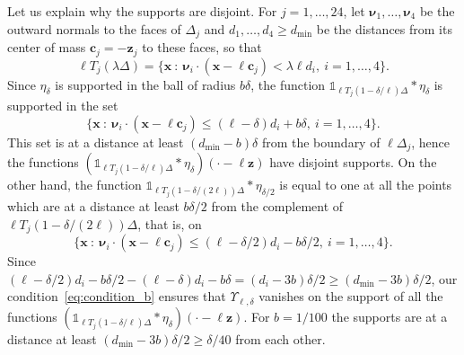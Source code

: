 \documentclass[final,reqno]{amsart}
\theoremstyle{remark}
\renewcommand{\le}{\leqslant}
\renewcommand{\ge}{\geqslant}
\newcommand{\iden}{\mathbb{1}}
\newcommand{\tetra}{\mathbb{\Delta}}
\begin{document}
Let us explain why the supports are disjoint. For $j=1,\ldots,24$, let $\bm{\nu}_1,\ldots,\bm{\nu}_4$ be the outward normals to the faces of $\tetra_j$ and $d_1,\ldots,d_4\ge d_{\min}$ be the distances from its center of mass $\mathbf{c}_j=-\mathbf{z}_j$ to these faces, so that
$$
\ell T_j(\lambda\tetra)=\big\{\mathbf{x}\ :\ \bm{\nu}_i\cdot(\mathbf{x}-\ell \mathbf{c}_j)<\lambda\ell d_i,\ i=1,\ldots,4\big\}.
$$
Since $\eta_\delta$ is supported in the ball of radius $b\delta$, the function $\iden_{\ell T_j(1-\delta/\ell)\tetra}\ast\eta_\delta$ is supported in the set
$$
\big\{\mathbf{x}\ :\ \bm{\nu}_i\cdot(\mathbf{x}-\ell \mathbf{c}_j)\le(\ell-\delta)d_i+b\delta,\ i=1,\ldots,4\big\}.
$$
This set is at a distance at least $(d_{\min}-b)\delta$ from the boundary of $\ell\tetra_j$, hence the functions $(\iden_{\ell T_j(1-\delta/\ell)\tetra}\ast\eta_\delta)(\cdot-\ell \mathbf{z})$ have disjoint supports. On the other hand, the function $\iden_{\ell T_j(1-\delta/(2\ell))\tetra}\ast \eta_{\delta/2}$ is equal to one at all the points which are at a distance at least $b\delta/2$ from the complement of $\ell T_j(1-\delta/(2\ell))\tetra$, that is, on
$$
\big\{\mathbf{x}\ :\ \bm{\nu}_i\cdot(\mathbf{x}-\ell \mathbf{c}_j)\le(\ell-\delta/2)d_i-b\delta/2,\ i=1,\ldots,4\big\}.
$$
Since $(\ell-\delta/2)d_i-b\delta/2-(\ell-\delta)d_i-b\delta=(d_i-3b)\delta/2\ge(d_{\min}-3b)\delta/2$, our condition~\cref{eq:condition_b} ensures that $\Upsilon_{\ell,\delta}$ vanishes on the support of all the functions $(\iden_{\ell T_j(1-\delta/\ell)\tetra}\ast\eta_\delta)(\cdot-\ell \mathbf{z})$. For $b=1/100$ the supports are at a distance at least $(d_{\min}-3b)\delta/2\ge\delta/40$ from each other. 
\end{document}
